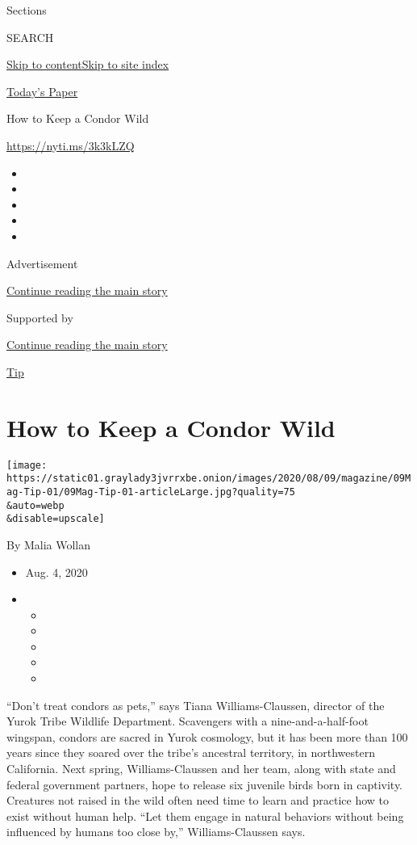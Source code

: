 Sections

SEARCH

\protect\hyperlink{site-content}{Skip to
content}\protect\hyperlink{site-index}{Skip to site index}

\href{https://myaccount.nytimes3xbfgragh.onion/auth/login?response_type=cookie\&client_id=vi}{}

\href{https://www.nytimes3xbfgragh.onion/section/todayspaper}{Today's
Paper}

How to Keep a Condor Wild

\url{https://nyti.ms/3k3kLZQ}

\begin{itemize}
\item
\item
\item
\item
\item
\end{itemize}

Advertisement

\protect\hyperlink{after-top}{Continue reading the main story}

Supported by

\protect\hyperlink{after-sponsor}{Continue reading the main story}

\href{/column/magazine-tip}{Tip}

\hypertarget{how-to-keep-a-condor-wild}{%
\section{How to Keep a Condor Wild}\label{how-to-keep-a-condor-wild}}

\texttt{[image: https://static01.graylady3jvrrxbe.onion/images/2020/08/09/magazine/09Mag-Tip-01/09Mag-Tip-01-articleLarge.jpg?quality=75\\\&auto=webp\\\&disable=upscale]}

By Malia Wollan

\begin{itemize}
\item
  Aug. 4, 2020
\item
  \begin{itemize}
  \item
  \item
  \item
  \item
  \item
  \end{itemize}
\end{itemize}

``Don't treat condors as pets,'' says Tiana Williams-Claussen, director
of the Yurok Tribe Wildlife Department. Scavengers with a
nine-and-a-half-foot wingspan, condors are sacred in Yurok cosmology,
but it has been more than 100 years since they soared over the tribe's
ancestral territory, in northwestern California. Next spring,
Williams-Claussen and her team, along with state and federal government
partners, hope to release six juvenile birds born in captivity.
Creatures not raised in the wild often need time to learn and practice
how to exist without human help. ``Let them engage in natural behaviors
without being influenced by humans too close by,'' Williams-Claussen
says.

